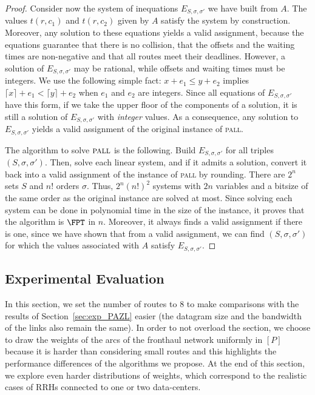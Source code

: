 \documentclass[a4paper,10pt]{journal}
\newcommand\pall{\textsc{pall}\xspace}
\begin{document}
\begin{proof}
Consider now the system of inequations $E_{S,\sigma,\sigma'}$ we have built from $A$.
The values $t(r,c_1)$ and $t(r,c_2)$ given by $A$ satisfy the system by construction. 
Moreover, any solution to these equations yields a valid assignment, because the equations guarantee 
that there is no collision, that the offsets and the waiting times are non-negative and that all routes meet their deadlines. However, a solution of $E_{S,\sigma,\sigma'}$ may be rational, while offsets and waiting times must be integers. We use the following simple fact: $x + e_1 \leq y + e_2$ implies $\lceil x \rceil + e_1 < \lceil y \rceil + e_2$ when $e_1$ and $e_2$ are integers. Since all equations of $E_{S,\sigma,\sigma'}$ have this form, if we take the upper floor of the components of a solution, it is still a solution of $E_{S,\sigma,\sigma'}$ with \emph{integer} values. As a consequence, any solution to $E_{S,\sigma,\sigma'}$ yields a valid assignment of the original instance of \pall.

The algorithm to solve $\pall$ is the following. Build $E_{S,\sigma,\sigma'}$ for all triples $(S,\sigma,\sigma')$. Then, solve each linear system, and if it admits a solution, convert it back into a
valid assignment of the instance of \pall by rounding. There are $2^n$ sets $S$ and $n!$ orders $\sigma$. Thus, $2^n(n!)^2$ systems with $2n$ variables and a bitsize of the same order as the original instance are solved at most. Since solving each system can be done in polynomial time in the size of the instance, it proves that the algorithm is $\FPT$ in $n$. Moreover, it always finds a valid assignment if there is one, since we have shown that from a valid assignment, we can find $(S,\sigma,\sigma')$ for which the values associated with $A$ satisfy $E_{S,\sigma,\sigma'}$.
\end{proof}


    \subsection{Experimental Evaluation}
    \label{sec:resultsPALL}

    In this section, we set the number of routes to $8$ to make comparisons with the results of Section~\ref{sec:exp_PAZL} easier (the datagram size and the bandwidth of the links also remain the same). In order to not overload the section, we choose to draw the weights of the arcs of the fronthaul network uniformly in $[P]$ because it is harder than considering small routes and this highlights the performance differences of the algorithms we propose. At the end of this section, we explore even harder distributions of weights, which correspond to the realistic cases of RRHs connected to one or two data-centers. 
\end{document}
